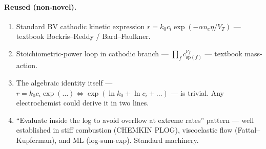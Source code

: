 \documentclass[11pt]{article}
\newcommand{\VT}{V_{T}}
\begin{document}
\paragraph{Reused (non-novel).}
\begin{enumerate}
\item Standard BV cathodic kinetic expression
      $r=k_0 c_i \exp(-\alpha n_e\eta/\VT)$ --- textbook Bockris--Reddy /
      Bard--Faulkner.
\item Stoichiometric-power loop in cathodic branch ---
      $\prod_f c_{\mathrm{sp}(f)}^{\nu_f}$ --- textbook mass-action.
\item The algebraic identity itself ---
      $r=k_0 c_i \exp(\dots)\Leftrightarrow\exp(\ln k_0+\ln c_i+\dots)$ --- is
      trivial. Any electrochemist could derive it in two lines.
\item ``Evaluate inside the log to avoid overflow at extreme rates'' pattern
      --- well established in stiff combustion (CHEMKIN PLOG), viscoelastic
      flow (Fattal--Kupferman), and ML (log-sum-exp). Standard machinery.
\end{enumerate}
\end{document}
